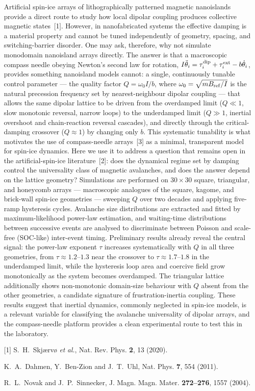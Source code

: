\documentclass[12pt,a4paper]{article}
\begin{document}
Artificial spin-ice arrays of lithographically patterned magnetic nanoislands provide a direct route to study how local dipolar coupling produces collective magnetic states~[1]. However, in nanofabricated systems the effective damping is a material property and cannot be tuned independently of geometry, spacing, and switching-barrier disorder. One may ask, therefore, why not simulate monodomain nanoisland arrays directly. The answer is that a macroscopic compass needle obeying Newton's second law for rotation, $I\ddot{\theta}_{i} = \tau_{i}^{\rm dip} + \tau_{i}^{\rm ext} - b\dot{\theta}_{i}$, provides something nanoisland models cannot: a single, continuously tunable control parameter --- the quality factor $Q = \omega_0 I/b$, where $\omega_0 = \sqrt{mB_{\rm ref}/I}$ is the natural precession frequency set by nearest-neighbour dipolar coupling --- that allows the same dipolar lattice to be driven from the overdamped limit ($Q \ll 1$, slow monotonic reversal, narrow loops) to the underdamped limit ($Q \gg 1$, inertial overshoot and chain-reaction reversal cascades), and directly through the critical-damping crossover ($Q \approx 1$) by changing only $b$. This systematic tunability is what motivates the use of compass-needle arrays~[3] as a minimal, transparent model for spin-ice dynamics. Here we use it to address a question that remains open in the artificial-spin-ice literature~[2]: does the dynamical regime set by damping control the universality class of magnetic avalanches, and does the answer depend on the lattice geometry? Simulations are performed on $30\times30$ square, triangular, and honeycomb arrays --- macroscopic analogues of the square, kagome, and brick-wall spin-ice geometries --- sweeping $Q$ over two decades and applying five-ramp hysteresis cycles. Avalanche size distributions are extracted and fitted by maximum-likelihood power-law estimation, and waiting-time distributions between successive events are analysed to discriminate between Poisson and scale-free (SOC-like) inter-event timing. Preliminary results already reveal the central signal: the power-law exponent $\tau$ increases systematically with $Q$ in all three geometries, from $\tau \approx 1.2$--$1.3$ near the crossover to $\tau \approx 1.7$--$1.8$ in the underdamped limit, while the hysteresis loop area and coercive field grow monotonically as the system becomes overdamped. The triangular lattice additionally shows non-monotonic domain-size behaviour with $Q$ absent from the other geometries, a candidate signature of frustration-inertia coupling. These results suggest that inertial dynamics, commonly neglected in spin-ice models, is a relevant variable for classifying the avalanche universality of dipolar arrays, and the compass-needle platform provides a clean experimental route to test this in the laboratory.
\vspace{6pt}

[1] S.~H.~Skj{\ae}rv{\o} \textit{et al.}, Nat. Rev. Phys. \textbf{2}, 13 (2020).\par
[2] K.~A.~Dahmen, Y.~Ben-Zion and J.~T.~Uhl, Nat. Phys. \textbf{7}, 554 (2011).\par
[3] R.~L.~Novak and J.~P.~Sinnecker, J. Magn. Magn. Mater. \textbf{272--276}, 1557 (2004).
\end{document}
